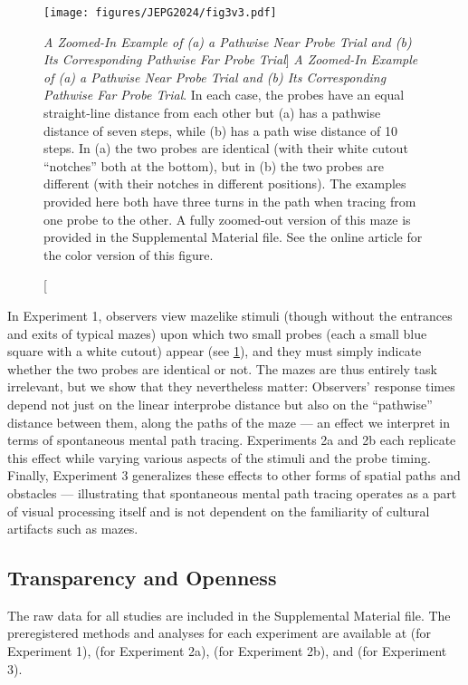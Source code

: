 \begin{figure}
    \centering
    \texttt{[image: figures/JEPG2024/fig3v3.pdf]}
    \caption
    [\textit{A Zoomed-In Example of (a) a Pathwise Near Probe Trial and (b) Its Corresponding Pathwise Far Probe Trial}]
    {\textit{A Zoomed-In Example of (a) a Pathwise Near Probe Trial and (b) Its Corresponding Pathwise Far Probe Trial}. In each case, the probes have an equal straight-line distance from each other but (a) has a pathwise distance of seven steps, while (b) has a path wise distance of 10 steps. In (a) the two probes are identical (with their white cutout “notches” both at the bottom), but in (b) the two probes are different (with their notches in different positions). The examples provided here both have three turns in the path when tracing from one probe to the other. A fully zoomed-out version of this maze is provided in the Supplemental Material file. See the online article for the color version of this figure.}
    \label{fig:JEPG2024_3}
\end{figure}
In Experiment 1, observers view mazelike stimuli (though without the entrances and exits of typical mazes) upon which two small probes (each a small blue square with a white cutout) appear (see \cref{fig:JEPG2024_3}), and they must simply indicate whether the two probes are identical or not. The mazes are thus entirely task irrelevant, but we show that they nevertheless matter: Observers’ response times depend not just on the linear interprobe distance but also on the “pathwise” distance between them, along the paths of the maze --- an effect we interpret in terms of spontaneous mental path tracing. Experiments 2a and 2b each replicate this effect while varying various aspects of the stimuli and the probe timing. Finally, Experiment 3 generalizes these effects to other forms of spatial paths and obstacles --- illustrating that spontaneous mental path tracing operates as a part of visual processing itself and is not dependent on the familiarity of cultural artifacts such as mazes.


\subsection{Transparency and Openness}
The raw data for all studies are included in the Supplemental Material file. The preregistered methods and analyses for each experiment are available at  (for Experiment 1),  (for Experiment 2a),  (for Experiment 2b), and  (for Experiment 3).

